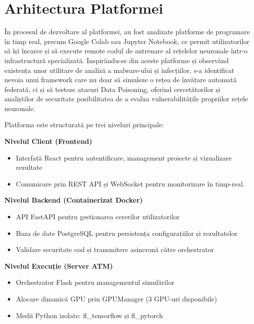 \documentclass[../../main.tex]{subfiles}
\begin{document}
    
    \section{Arhitectura Platformei}

	    În procesul de dezvoltare al platformei, au fost analizate platforme de programare în timp real, precum Google Colab sau Jupyter Notebook, ce permit utilizatorilor să își încarce și să execute remote codul de antrenare al rețelelor neuronale într-o infrastructură specializată.
	    Inspirându-se din aceste platforme și observând existența unor utilitare de analiză a malware-ului și infecțiilor, s-a identificat nevoia unui framework care nu doar să simuleze o rețea de învățare automată federată, ci și să testeze atacuri Data Poisoning, oferind cercetătorilor și analiștilor de securitate posibilitatea de a evalua vulnerabilitățile propriilor rețele neuronale.
    
    Platforma este structurată pe trei niveluri principale:

    \textbf{Nivelul Client (Frontend)}

    \begin{itemize}
	        \item Interfață React pentru autentificare, management proiecte și vizualizare rezultate
        \item Comunicare prin REST API și WebSocket pentru monitorizare în timp-real. 
    \end{itemize}

    \textbf{Nivelul Backend (Containerizat Docker)}
    \begin{itemize}
        \item API FastAPI pentru gestionarea cererilor utilizatorilor
        \item Baza de date PostgreSQL pentru persistența configurațiilor și rezultatelor
        \item Validare securitate cod și transmitere asincronă către orchestrator
    \end{itemize}

    \textbf{Nivelul Execuție (Server ATM)}
    \begin{itemize}
        \item Orchestrator Flask pentru managementul simulărilor
        \item Alocare dinamică GPU prin GPUManager (3 GPU-uri disponibile)
        \item Medii Python izolate: fl\_tensorflow și fl\_pytorch
    \end{itemize}
\end{document}
